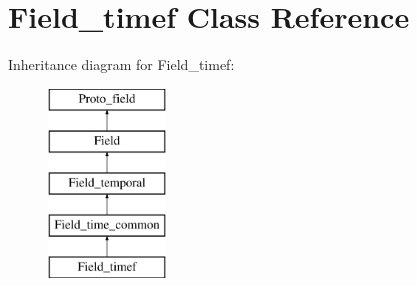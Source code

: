 \hypertarget{classField__timef}{}\section{Field\+\_\+timef Class Reference}
\label{classField__timef}
Inheritance diagram for Field\+\_\+timef\+:\begin{figure}[H]
\begin{center}
\leavevmode
\includegraphics[height=5.000000cm]{classField__timef}
\end{center}
\end{figure}
